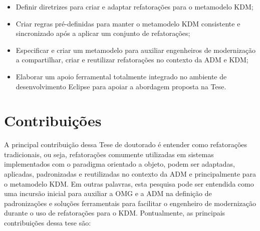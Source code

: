 \begin{itemize}
	\item Definir diretrizes para criar e adaptar refatorações para o metamodelo KDM;
	
	\item Criar regras pré-definidas para manter o metamodelo KDM consistente e sincronizado após a aplicar um conjunto de refatorações;
	
	\item Especificar e criar um metamodelo para auxiliar engenheiros de modernização a compartilhar, criar e reutilizar refatorações no contexto da ADM e KDM;
	
	\item Elaborar um apoio ferramental totalmente integrado no ambiente de desenvolvimento Eclipse para apoiar a abordagem proposta na Tese.%
\end{itemize}


\section{Contribuições}\label{sec:contribuicoes}

A principal contribuição dessa Tese de doutorado é entender como refatorações tradicionais, ou seja, refatorações comumente utilizadas em sistemas implementados com o paradigma orientado a objeto, podem ser adaptadas, aplicadas, padronizadas e reutilizadas no contexto da ADM e principalmente para o metamodelo KDM. Em outras palavras, esta pesquisa pode ser entendida como uma incursão inicial para auxiliar a OMG e a ADM na definição de padronizações e soluções ferramentais para facilitar o engenheiro de modernização durante o uso de refatorações para o KDM. Pontualmente, as principais contribuições dessa tese são:

